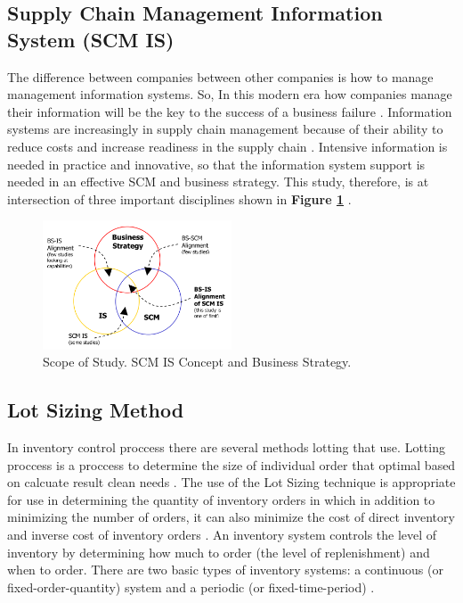 \documentclass[12pt,a4paper,final]{iopart}
\begin{document}
\subsection{Supply Chain Management Information System (SCM IS)}
The difference between companies between other companies is how to manage management information systems. So, In this modern era how companies manage their information will be the key to the success of a business failure \cite{Indrajit2016a}. Information systems are increasingly in supply chain management because of their ability to reduce costs and increase readiness in the supply chain \cite{Harianja2009}. Intensive information is needed in practice and innovative, so that the information system support is needed in an effective SCM and business strategy. This study, therefore, is at intersection of three important disciplines shown in \textbf{Figure \ref{figureScope}} \cite{Sathasivam, Harianja2009}.
\begin{figure}[htb!]
	\centering
	\includegraphics[width=0.5\textwidth]
	{scopeofstudy.png}
	\caption{\label{figureScope}Scope of Study. SCM IS Concept and Business Strategy.}
\end{figure}

\subsection{Lot Sizing Method}

In inventory control proccess there are several methods lotting that use. Lotting proccess is a proccess to determine the size of individual order that optimal based on calcuate result clean needs \cite{Ibrahim}. The use of the Lot Sizing technique is appropriate for use in determining the quantity of inventory orders in which in addition to minimizing the number of orders, it can also minimize the cost of direct inventory and inverse cost of inventory orders \cite{Djunaidi2019}. An inventory system controls the level of inventory by determining how much to order (the level of replenishment) and when to order. There are two basic types of inventory systems: a continuous (or fixed-order-quantity) system and a periodic (or fixed-time-period) \cite{Rusell2011}. 
\end{document}
